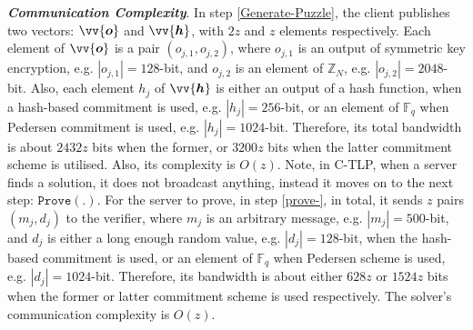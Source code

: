  \noindent\textbf{\textit{Communication Complexity}}.  In step \ref{Generate-Puzzle}, the client publishes two vectors: $\vv{\bm{o}}$ and $\vv{\bm{h}}$, with  $2 z$ and $z$ elements respectively.  Each element of $\vv{\bm{o}}$ is a pair $(o_{\scriptscriptstyle j,1},o_{\scriptscriptstyle j,2})$, where $o_{\scriptscriptstyle j,1}$ is an output of symmetric key encryption, e.g.   $|o_{\scriptscriptstyle j,1}|=128$-bit, and $o_{\scriptscriptstyle j,2}$ is an element of $\mathbb{Z}_{\scriptscriptstyle N}$, e.g.  $|o_{\scriptscriptstyle j,2}|=2048$-bit. Also, each element $h_{\scriptscriptstyle j}$ of $\vv{\bm{h}}$ is either an output of a hash function, when a hash-based commitment is used, e.g.  $|h_{\scriptscriptstyle j}|=256$-bit, or an element of $\mathbb{F}_{\scriptscriptstyle q}$ when Pedersen commitment is used, e.g.  $|h_{\scriptscriptstyle j}|=1024$-bit. Therefore, its total bandwidth is about $2432 z$ bits when the former,  or $3200 z$ bits when the latter commitment scheme is utilised. Also, its   complexity is $O(z)$. Note,  in  C-TLP, when a server finds a solution, it does not broadcast anything, instead it moves on  to the next step:  $\mathtt{Prove}(.)$. For the server to prove, in step \ref{prove-},  in total,  it sends $z$ pairs $(m_{\scriptscriptstyle j},d_{\scriptscriptstyle j})$ to the verifier, where $m_{\scriptscriptstyle j}$  is an arbitrary message, e.g.  $|m_{\scriptscriptstyle j}|=500$-bit, and  $d_{\scriptscriptstyle j}$ is either a long enough random value, e.g. $|d_{\scriptscriptstyle j}|=128$-bit, when the hash-based commitment is used, or an element of $\mathbb{F}_{\scriptscriptstyle q}$ when Pedersen scheme is used, e.g. $|d_{\scriptscriptstyle j}|=1024$-bit. Therefore, its bandwidth is about either $628 z$ or $1524 z$ bits when the former or latter commitment scheme is used respectively. The solver's  communication complexity is $O(z)$. 
 

 
